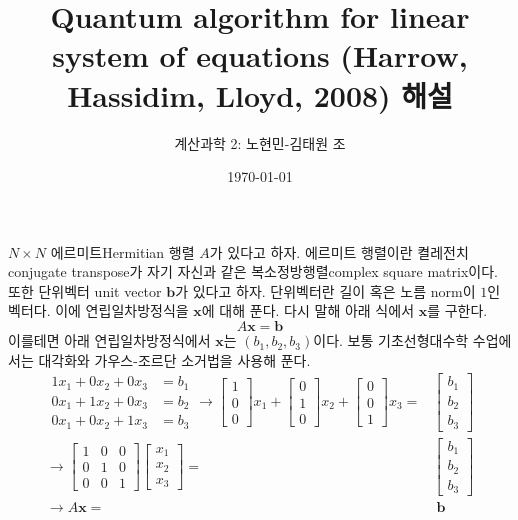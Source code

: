 \documentclass[a4paper,atbegshi,chapter]{oblivoir}
\title{\small Quantum algorithm for linear system of equations 
(Harrow, Hassidim, Lloyd, 2008) 해설}
\author{계산과학 2: 노현민-김태원 조}
\date{\today}
\begin{document}
\maketitle
$N\times N$ 에르미트{\footnotesize Hermitian} 행렬 $A$가 있다고 하자. 에르미트
행렬이란 켤레전치{\footnotesize conjugate transpose}가 자기 자신과 같은
복소정방행렬{\footnotesize complex square matrix}이다. 또한 단위벡터{\footnotesize
unit vector} $\mathbf{b}$가 있다고 하자. 단위벡터란 길이 혹은 노름{\footnotesize
norm}이 $1$인 벡터다. 이에 연립일차방정식을 $\mathbf{x}$에 대해 푼다. 다시 말해
아래 식에서 $\mathbf{x}$를 구한다.
\[
  A\mathbf{x}=\mathbf{b}
\]
이를테면 아래 연립일차방정식에서 $\mathbf{x}$는 $(b_1,b_2,b_3)$이다. 보통
기초선형대수학 수업에서는 대각화와 가우스-조르단 소거법을 사용해 푼다.
\begin{align*}
  \begin{matrix}
  1x_1+0x_2+0x_3 &= b_1 \\
  0x_1+1x_2+0x_3 &= b_2\\
  0x_1+0x_2+1x_3 &= b_3
\end{matrix}\longrightarrow
\begin{bmatrix}
  1\\0\\0
\end{bmatrix}x_1+
\begin{bmatrix}
  0\\1\\0
\end{bmatrix}x_2+
\begin{bmatrix}
  0\\0\\1
\end{bmatrix}x_3=&
\begin{bmatrix}
  b_1\\b_2\\b_3
\end{bmatrix}
  \\\longrightarrow
\begin{bmatrix}
  1&0&0\\0&1&0\\0&0&1
\end{bmatrix}
\begin{bmatrix}x_1\\x_2\\x_3\end{bmatrix}
  =&\begin{bmatrix}b_1\\b_2\\b_3\end{bmatrix}\\\longrightarrow
  A\mathbf{x}=&\;\mathbf{b}
\end{align*}
\end{document}

